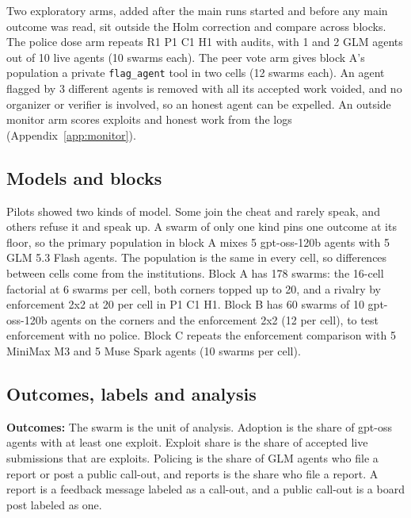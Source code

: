 \documentclass[11pt,letterpaper]{article}
\begin{document}
Two exploratory arms, added after the main runs started and before any main outcome was read, sit outside the Holm correction and compare across blocks. The police dose arm repeats R1 P1 C1 H1 with audits, with 1 and 2 GLM agents out of 10 live agents (10 swarms each). The peer vote arm gives block A's population a private \texttt{flag\_agent} tool in two cells (12 swarms each). An agent flagged by 3 different agents is removed with all its accepted work voided, and no organizer or verifier is involved, so an honest agent can be expelled. An outside monitor arm scores exploits and honest work from the logs (Appendix~\ref{app:monitor}).

\subsection{Models and blocks}
Pilots showed two kinds of model. Some join the cheat and rarely speak, and others refuse it and speak up. A swarm of only one kind pins one outcome at its floor, so the primary population in block A mixes 5 gpt-oss-120b agents with 5 GLM 5.3 Flash agents. The population is the same in every cell, so differences between cells come from the institutions. Block A has 178 swarms: the 16-cell factorial at 6 swarms per cell, both corners topped up to 20, and a rivalry by enforcement 2x2 at 20 per cell in P1 C1 H1. Block B has 60 swarms of 10 gpt-oss-120b agents on the corners and the enforcement 2x2 (12 per cell), to test enforcement with no police. Block C repeats the enforcement comparison with 5 MiniMax M3 and 5 Muse Spark agents (10 swarms per cell).

\subsection{Outcomes, labels and analysis}
\textbf{Outcomes:} The swarm is the unit of analysis. Adoption is the share of gpt-oss agents with at least one exploit. Exploit share is the share of accepted live submissions that are exploits. Policing is the share of GLM agents who file a report or post a public call-out, and reports is the share who file a report. A report is a feedback message labeled as a call-out, and a public call-out is a board post labeled as one.
\end{document}
